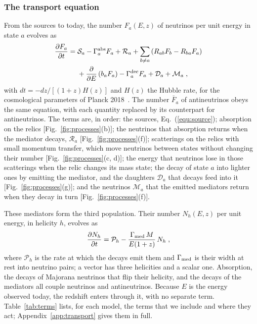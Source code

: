 \documentclass[linenumbers, aps, prd, twocolumn, superscriptaddress, floatfix, longbibliography, nofootinbib, bibnotes]{revtex4-2}
\begin{document}
\subsubsection{The transport equation}
From the sources to today, the number $F_a(E, z)$ of neutrinos per unit energy in state $a$ evolves as
\begin{equation}
 \label{equ:transport}
 \begin{split}
 \frac{\partial F_a}{\partial t} = \; & \mathcal{S}_a - \Gamma^{\rm abs}_a F_a + \mathcal{R}_a + \sum_{b \neq a} \left( R_{ab} F_b - R_{ba} F_a \right) \\
 & + \frac{\partial}{\partial E} \left( b_a F_a \right) - \Gamma^{\rm dec}_a F_a + \mathcal{D}_a + \mathcal{M}_a \;,
 \end{split}
\end{equation}
with $dt = -dz / [(1+z) H(z)]$ and $H(z)$ the Hubble rate, for the cosmological parameters of Planck 2018~\cite{Planck:2018vyg}.
The number $\bar F_a$ of antineutrinos obeys the same equation, with each quantity replaced by its counterpart for antineutrinos.
The terms are, in order:
the sources, Eq.~(\ref{equ:source});
absorption on the relics [Fig.~\ref{fig:processes}(b)];
the neutrinos that absorption returns when the mediator decays, $\mathcal{R}_a$ [Fig.~\ref{fig:processes}(f)];
scatterings on the relics with small momentum transfer, which move neutrinos between states without changing their number [Fig.~\ref{fig:processes}(c, d)];
the energy that neutrinos lose in those scatterings when the relic changes its mass state;
the decay of state $a$ into lighter ones by emitting the mediator, and the daughters $\mathcal{D}_a$ that decays feed into it [Fig.~\ref{fig:processes}(g)];
and the neutrinos $\mathcal{M}_a$ that the emitted mediators return when they decay in turn [Fig.~\ref{fig:processes}(f)].

These mediators form the third population.
Their number $N_h(E, z)$ per unit energy, in helicity $h$, evolves as
\begin{equation}
 \label{equ:mediators}
 \frac{\partial N_h}{\partial t} = \mathcal{P}_h - \frac{\Gamma_{\rm med}\, M}{E(1+z)}\, N_h \;,
\end{equation}
where $\mathcal{P}_h$ is the rate at which the decays emit them and $\Gamma_{\rm med}$ is their width at rest into neutrino pairs; a vector has three helicities and a scalar one.
Absorption, the decays of Majorana neutrinos that flip their helicity, and the decays of the mediators all couple neutrinos and antineutrinos.
Because $E$ is the energy observed today, the redshift enters through it, with no separate term.
Table~\ref{tab:terms} lists, for each model, the terms that we include and where they act; Appendix~\ref{app:transport} gives them in full.
\end{document}
